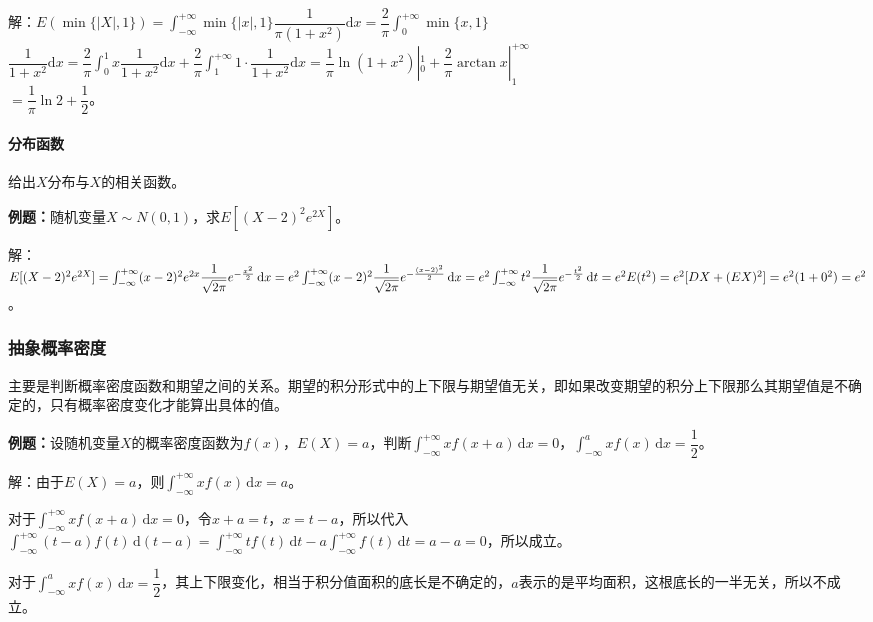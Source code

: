 解：$E(\min\{\vert X\vert,1\})=\displaystyle{\int_{-\infty}^{+\infty}}\min\{\vert x\vert,1\}\dfrac{1}{\pi(1+x^2)}\textrm{d}x=\dfrac{2}{\pi}\int_0^{+\infty}\min\{x,1\}$\\$\dfrac{1}{1+x^2}\textrm{d}x=\dfrac{2}{\pi}\displaystyle{\int_0^1}x\dfrac{1}{1+x^2}\textrm{d}x+\dfrac{2}{\pi}\int_1^{+\infty}1\cdot\dfrac{1}{1+x^2}\textrm{d}x=\dfrac{1}{\pi}\ln(1+x^2)|_0^1+\dfrac{2}{\pi}\arctan x|_1^{+\infty}$\\$=\dfrac{1}{\pi}\ln2+\dfrac{1}{2}$。

\paragraph{分布函数} \leavevmode \medskip

给出$X$分布与$X$的相关函数。

\textbf{例题：}随机变量$X\sim N(0,1)$，求$E[(X-2)^2e^{2X}]$。

解：$E[(X-2)^2e^{2X}]=\int_{-\infty}^{+\infty}(x-2)^2e^{2x}\dfrac{1}{\sqrt{2\pi}}e^{-\frac{x^2}{2}}\,\textrm{d}x\\=e^2\int_{-\infty}^{+\infty}(x-2)^2\dfrac{1}{\sqrt{2\pi}}e^{-\frac{(x-2)^2}{2}}\,\textrm{d}x=e^2\int_{-\infty}^{+\infty}t^2\dfrac{1}{\sqrt{2\pi}}e^{-\frac{t^2}{2}}\,\textrm{d}t=e^2E(t^2)=e^2[DX+(EX)^2]=e^2(1+0^2)=e^2$。

\subsubsection{抽象概率密度}

主要是判断概率密度函数和期望之间的关系。期望的积分形式中的上下限与期望值无关，即如果改变期望的积分上下限那么其期望值是不确定的，只有概率密度变化才能算出具体的值。

\textbf{例题：}设随机变量$X$的概率密度函数为$f(x)$，$E(X)=a$，判断$\int_{-\infty}^{+\infty}xf(x+a)\,\textrm{d}x=0$，$\int_{-\infty}^axf(x)\,\textrm{d}x=\dfrac{1}{2}$。

解：由于$E(X)=a$，则$\int_{-\infty}^{+\infty}xf(x)\,\textrm{d}x=a$。

对于$\int_{-\infty}^{+\infty}xf(x+a)\,\textrm{d}x=0$，令$x+a=t$，$x=t-a$，所以代入$\int_{-\infty}^{+\infty}(t-a)f(t)\,\textrm{d}(t-a)=\int_{-\infty}^{+\infty}tf(t)\,\textrm{d}t-a\int_{-\infty}^{+\infty}f(t)\,\textrm{d}t=a-a=0$，所以成立。

对于$\int_{-\infty}^axf(x)\,\textrm{d}x=\dfrac{1}{2}$，其上下限变化，相当于积分值面积的底长是不确定的，$a$表示的是平均面积，这根底长的一半无关，所以不成立。

